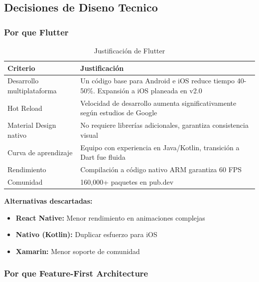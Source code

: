 \subsection{Decisiones de Diseno Tecnico}

\setlength{\tabcolsep}{4pt}

\subsubsection{Por que Flutter}

\begin{table}[H]
\centering
\small
\begin{tabularx}{\textwidth}{|>{\raggedright\arraybackslash}p{4.2cm}|X|}
\hline
\textbf{Criterio} & \textbf{Justificación} \\
\hline
Desarrollo multiplataforma & Un código base para Android e iOS reduce tiempo 40-50\%. Expansión a iOS planeada en v2.0 \\
\hline
Hot Reload & Velocidad de desarrollo aumenta significativamente según estudios de Google \cite{flutter_performance} \\
\hline
Material Design nativo & No requiere librerías adicionales, garantiza consistencia visual \\
\hline
Curva de aprendizaje & Equipo con experiencia en Java/Kotlin, transición a Dart fue fluida \\
\hline
Rendimiento & Compilación a código nativo ARM garantiza 60 FPS \\
\hline
Comunidad & 160,000+ paquetes en pub.dev \\
\hline
\end{tabularx}
\caption{Justificación de Flutter}
\end{table}

\textbf{Alternativas descartadas:}
\begin{itemize}
    \item \textbf{React Native:} Menor rendimiento en animaciones complejas
    \item \textbf{Nativo (Kotlin):} Duplicar esfuerzo para iOS
    \item \textbf{Xamarin:} Menor soporte de comunidad
\end{itemize}

\subsubsection{Por que Feature-First Architecture}

